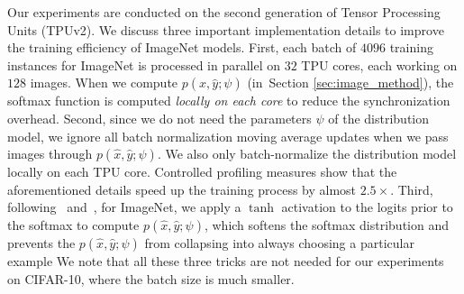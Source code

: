Our experiments are conducted on the second generation of Tensor Processing Units (TPUv2). We discuss three important implementation details to improve the training efficiency of ImageNet models. First, each batch of $4096$ training instances for ImageNet is processed in parallel on $32$ TPU cores, each working on $128$ images. When we compute $p(\hat{x}, \hat{y}; \psi)$ (in~Section \ref{sec:image_method}), the softmax function is computed \textit{locally on each core} to reduce the synchronization overhead. Second, since we do not need the parameters $\psi$ of the distribution model, we ignore all batch normalization moving average updates when we pass images through $p(\hat{x}, \hat{y}; \psi)$. We also only batch-normalize the distribution model locally on each TPU core. Controlled profiling measures show that the aforementioned details speed up the training process by almost $2.5 \times$. Third, following~\citet{neural_combi} and~\citet{enas}, for ImageNet, we apply a $\tanh$ activation to the logits prior to the softmax to compute $p(\hat{x}, \hat{y}; \psi)$, which softens the softmax distribution and prevents the $p(\hat{x}, \hat{y}; \psi)$ from collapsing into always choosing a particular example 
We note that all these three tricks are not needed for our experiments on CIFAR-10, where the batch size is much smaller.

